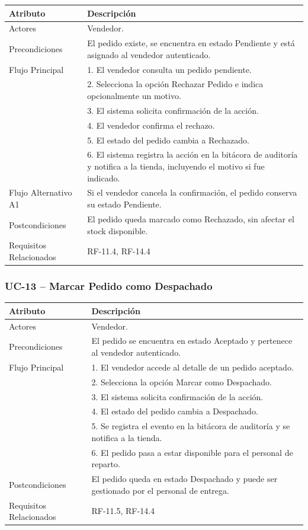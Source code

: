 \documentclass[12pt,a4paper]{report}
\begin{document}
\begin{longtable}{|p{4cm}|p{10cm}|}
\hline
\textbf{Atributo} & \textbf{Descripción} \\ \hline
Actores & Vendedor. \\ \hline
Precondiciones & El pedido existe, se encuentra en estado Pendiente y está asignado al vendedor autenticado. \\ \hline
Flujo Principal &
1. El vendedor consulta un pedido pendiente.\\
& 2. Selecciona la opción Rechazar Pedido e indica opcionalmente un motivo.\\
& 3. El sistema solicita confirmación de la acción.\\
& 4. El vendedor confirma el rechazo.\\
& 5. El estado del pedido cambia a Rechazado.\\
& 6. El sistema registra la acción en la bitácora de auditoría y notifica a la tienda, incluyendo el motivo si fue indicado. \\ \hline
Flujo Alternativo A1 & Si el vendedor cancela la confirmación, el pedido conserva su estado Pendiente. \\ \hline
Postcondiciones & El pedido queda marcado como Rechazado, sin afectar el stock disponible. \\ \hline
Requisitos Relacionados & RF-11.4, RF-14.4 \\ \hline
\end{longtable}


\subsubsection{UC-13 -- Marcar Pedido como Despachado}

\begin{longtable}{|p{4cm}|p{10cm}|}
\hline
\textbf{Atributo} & \textbf{Descripción} \\ \hline
Actores & Vendedor. \\ \hline
Precondiciones & El pedido se encuentra en estado Aceptado y pertenece al vendedor autenticado. \\ \hline
Flujo Principal &
1. El vendedor accede al detalle de un pedido aceptado.\\
& 2. Selecciona la opción Marcar como Despachado.\\
& 3. El sistema solicita confirmación de la acción.\\
& 4. El estado del pedido cambia a Despachado.\\
& 5. Se registra el evento en la bitácora de auditoría y se notifica a la tienda.\\
& 6. El pedido pasa a estar disponible para el personal de reparto. \\ \hline
Postcondiciones & El pedido queda en estado Despachado y puede ser gestionado por el personal de entrega. \\ \hline
Requisitos Relacionados & RF-11.5, RF-14.4 \\ \hline
\end{longtable}
\end{document}
